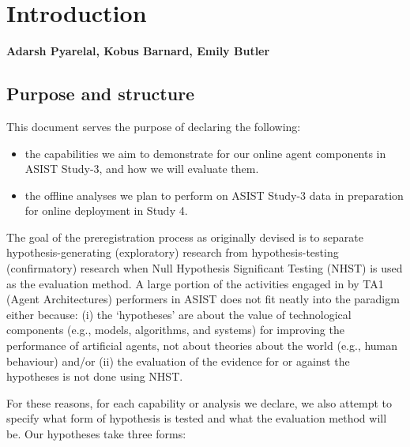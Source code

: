 \chapter{Introduction}
\textbf{Adarsh Pyarelal, Kobus Barnard, Emily Butler}

\section{Purpose and structure}

This document serves the purpose of declaring the following:

\begin{itemize}
    \item the capabilities we aim to demonstrate for our online agent
        components in ASIST Study-3, and how we will evaluate them.
    \item the offline analyses we plan to perform on ASIST Study-3 data
        in preparation for online deployment in Study 4.
\end{itemize}


The goal of the preregistration process as originally devised
\citep{Nosek.ea:2018} is to separate hypothesis-generating (exploratory)
research from hypothesis-testing (confirmatory) research when Null Hypothesis
Significant Testing (NHST) is used as the evaluation method. A large portion of
the activities engaged in by TA1 (Agent Architectures) performers in ASIST does
not fit neatly into the paradigm either because: (i) the `hypotheses' are about
the value of technological components (e.g., models, algorithms, and systems)
for improving the performance of artificial agents, not about theories about
the world (e.g., human behaviour) and/or (ii) the evaluation of the evidence
for or against the hypotheses is not done using NHST.

For these reasons, for each capability or analysis we declare, we also attempt
to specify what form of hypothesis is tested and what the evaluation method
will be. Our hypotheses take three forms:

